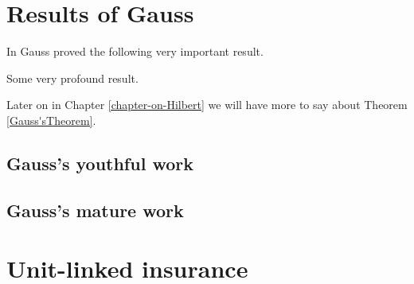 \documentclass{report}
\begin{document}
\chapter{Results of Gauss}    \label{annuity}

In \cite{bib:Gauss} Gauss proved the following very important result.

\begin{ttt}[Gauss]    \label{Gauss'sTheorem}
Some very profound result.
\end{ttt}


Later on in Chapter \ref{chapter-on-Hilbert}
we will have more to say about Theorem \ref{Gauss'sTheorem}.


\section{Gauss's youthful work}




\section{Gauss's mature work}













\chapter{Unit-linked insurance}     \label{unit-linked}





\end{document}
